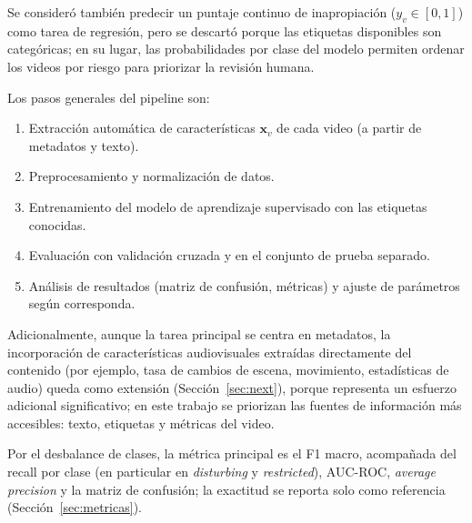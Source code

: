 \documentclass[conference]{IEEEtran}
\begin{document}
Se consideró también predecir un puntaje continuo de inapropiación ($y_v \in [0,1]$) como tarea de regresión, pero se descartó porque las etiquetas disponibles son categóricas; en su lugar, las probabilidades por clase del modelo permiten ordenar los videos por riesgo para priorizar la revisión humana.

Los pasos generales del pipeline son:
\begin{enumerate}
\item Extracción automática de características $\mathbf{x}_v$ de cada video (a partir de metadatos y texto).
\item Preprocesamiento y normalización de datos.
\item Entrenamiento del modelo de aprendizaje supervisado con las etiquetas conocidas.
\item Evaluación con validación cruzada y en el conjunto de prueba separado.
\item Análisis de resultados (matriz de confusión, métricas) y ajuste de parámetros según corresponda.
\end{enumerate}
Adicionalmente, aunque la tarea principal se centra en metadatos, la incorporación de características audiovisuales extraídas directamente del contenido (por ejemplo, tasa de cambios de escena, movimiento, estadísticas de audio) queda como extensión (Sección~\ref{sec:next}), porque representa un esfuerzo adicional significativo; en este trabajo se priorizan las fuentes de información más accesibles: texto, etiquetas y métricas del video.

Por el desbalance de clases, la métrica principal es el F1 macro, acompañada del recall por clase (en particular en \textit{disturbing} y \textit{restricted}), AUC-ROC, \textit{average precision} y la matriz de confusión; la exactitud se reporta solo como referencia (Sección~\ref{sec:metricas}).
\end{document}
